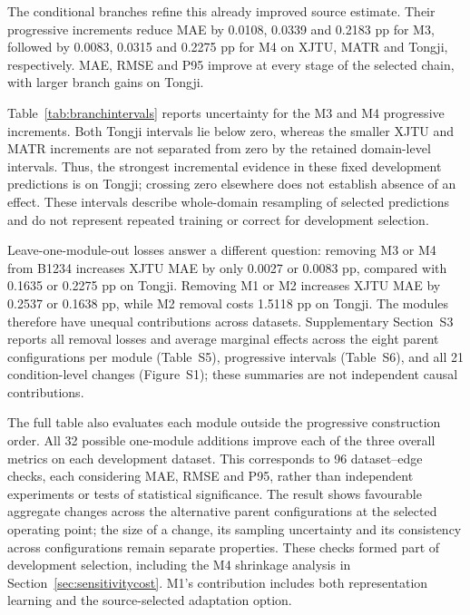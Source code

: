 \documentclass[preprint,12pt]{elsarticle}
\begin{document}


The conditional branches refine this already improved source estimate. Their progressive increments reduce MAE by 0.0108, 0.0339 and 0.2183 pp for M3, followed by 0.0083, 0.0315 and 0.2275 pp for M4 on XJTU, MATR and Tongji, respectively. MAE, RMSE and P95 improve at every stage of the selected chain, with larger branch gains on Tongji.

Table~\ref{tab:branchintervals} reports uncertainty for the M3 and M4 progressive increments. Both Tongji intervals lie below zero, whereas the smaller XJTU and MATR increments are not separated from zero by the retained domain-level intervals. Thus, the strongest incremental evidence in these fixed development predictions is on Tongji; crossing zero elsewhere does not establish absence of an effect. These intervals describe whole-domain resampling of selected predictions and do not represent repeated training or correct for development selection.



Leave-one-module-out losses answer a different question: removing M3 or M4 from B1234 increases XJTU MAE by only 0.0027 or 0.0083 pp, compared with 0.1635 or 0.2275 pp on Tongji. Removing M1 or M2 increases XJTU MAE by 0.2537 or 0.1638 pp, while M2 removal costs 1.5118 pp on Tongji. The modules therefore have unequal contributions across datasets. Supplementary Section~S3 reports all removal losses and average marginal effects across the eight parent configurations per module (Table~S5), progressive intervals (Table~S6), and all 21 condition-level changes (Figure~S1); these summaries are not independent causal contributions.

The full table also evaluates each module outside the progressive construction order. All 32 possible one-module additions improve each of the three overall metrics on each development dataset. This corresponds to 96 dataset--edge checks, each considering MAE, RMSE and P95, rather than independent experiments or tests of statistical significance. The result shows favourable aggregate changes across the alternative parent configurations at the selected operating point; the size of a change, its sampling uncertainty and its consistency across configurations remain separate properties. These checks formed part of development selection, including the M4 shrinkage analysis in Section~\ref{sec:sensitivitycost}. M1's contribution includes both representation learning and the source-selected adaptation option.
\end{document}
